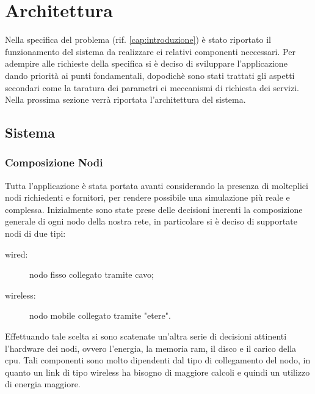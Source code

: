 \chapter{Architettura}\label{cap:architettura}
Nella specifica del problema (rif. \ref{cap:introduzione}) è stato riportato il funzionamento del sistema da realizzare ei relativi componenti neccessari. Per adempire alle richieste della specifica si è deciso di sviluppare l'applicazione dando priorità ai punti fondamentali, dopodichè sono stati trattati gli aspetti secondari come la taratura dei parametri ei meccanismi di richiesta dei servizi. Nella prossima sezione verrà riportata l'architettura del sistema.
\section{Sistema}
\subsection{Composizione Nodi}
Tutta l'applicazione è stata portata avanti considerando la presenza di molteplici nodi richiedenti e fornitori, per rendere possibile una simulazione più reale e complessa. Inizialmente sono state prese delle decisioni inerenti la composizione generale di ogni nodo della nostra rete, in particolare si è deciso di supportate nodi di due tipi:
\begin{description}
\item[wired:] nodo fisso collegato tramite cavo;
\item[wireless:] nodo mobile collegato tramite "etere".
\end{description}
Effettuando tale scelta si sono scatenate un'altra serie di decisioni attinenti l'hardware dei nodi, ovvero l'energia, la memoria ram, il disco e il carico della cpu. Tali componenti sono molto dipendenti dal tipo di collegamento del nodo, in quanto un link di tipo wireless ha bisogno di maggiore calcoli e quindi un utilizzo di energia maggiore.
